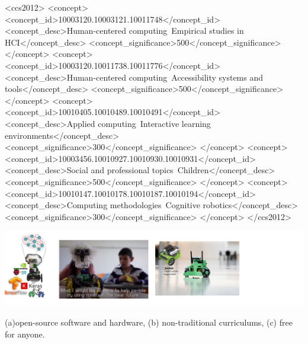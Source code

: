 \documentclass[sigconf]{acmart}
\begin{document}
\begin{CCSXML}
<ccs2012>
     <concept>
         <concept_id>10003120.10003121.10011748</concept_id>
         <concept_desc>Human-centered computing~Empirical studies in HCI</concept_desc>
         <concept_significance>500</concept_significance>
         </concept>
     <concept>
         <concept_id>10003120.10011738.10011776</concept_id>
         <concept_desc>Human-centered computing~Accessibility systems and tools</concept_desc>
         <concept_significance>500</concept_significance>
         </concept>
     <concept>
         <concept_id>10010405.10010489.10010491</concept_id>
         <concept_desc>Applied computing~Interactive learning environments</concept_desc>
         <concept_significance>300</concept_significance>
         </concept>
     <concept>
         <concept_id>10003456.10010927.10010930.10010931</concept_id>
         <concept_desc>Social and professional topics~Children</concept_desc>
         <concept_significance>500</concept_significance>
         </concept>
     <concept>
         <concept_id>10010147.10010178.10010187.10010194</concept_id>
         <concept_desc>Computing methodologies~Cognitive robotics</concept_desc>
         <concept_significance>300</concept_significance>
         </concept>
</ccs2012>
\end{CCSXML}



\begin{teaserfigure}
  \includegraphics[width=\textwidth]{../figures/air4children/versions/drawing-v00.png}
  \caption{(a)open-source software and hardware, (b) non-traditional curriculums, (c) free for anyone.}
  \label{fig:teaser}
\end{teaserfigure}
\end{document}
